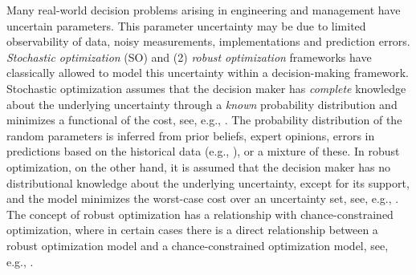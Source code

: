 \documentclass[final,onefignum,onetabnum]{class}
\begin{document}
Many real-world decision problems arising in engineering  and management  have uncertain parameters. This parameter uncertainty may be due to limited observability of data, noisy measurements, implementations and  prediction errors. %
{\it Stochastic optimization} (SO) and (2) {\it robust optimization} frameworks have classically allowed  to model this uncertainty within a decision-making framework. Stochastic optimization assumes that the decision maker has {\it complete} knowledge about the underlying uncertainty through a {\it known} probability distribution and minimizes a functional of the cost, see, e.g., \citet{shapiro2014SP,birge2011SP}. The probability distribution of the random parameters is inferred from prior beliefs, expert opinions, errors in predictions based on the historical data (e.g., \citet{kim2015scheduling}), or a mixture of these. In robust optimization, on the other hand, it is assumed that the decision maker has no distributional knowledge  about the underlying uncertainty, except for its support, and the model minimizes the worst-case cost over an uncertainty set, see, e.g., \citet{elghaoui1997lsq,elghaoui1998SDP,ben1998robust,bertsimas2004price,ben2000robust,ben2009RO}. The concept of robust optimization has a relationship with chance-constrained optimization, where in certain cases there is a direct relationship between a robust optimization model and a chance-constrained optimization model, see, e.g., \citet[~pp157--158]{boyd2004CVX}.
\end{document}
